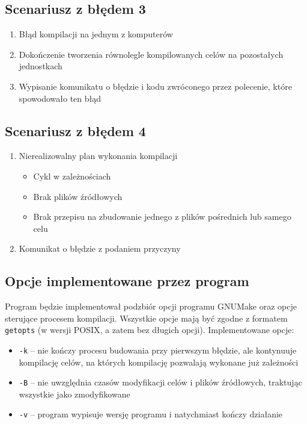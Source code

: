 \documentclass[a4paper]{article}
\begin{document}
\subsection{Scenariusz z błędem 3}

\begin{enumerate}
	\item Błąd kompilacji na jednym z komputerów
	\item Dokończenie tworzenia równolegle kompilowanych celów na pozostałych jednostkach
	\item Wypisanie komunikatu o błędzie i kodu zwróconego przez polecenie, które spowodowało ten błąd
\end{enumerate}


\subsection{Scenariusz z błędem 4}

\begin{enumerate}
	\item Nierealizowalny plan wykonania kompilacji
		\begin{itemize}
			\item Cykl w zależnościach
			\item Brak plików źródłowych
			\item Brak przepisu na zbudowanie jednego z plików pośrednich lub samego celu
		\end{itemize}
	\item Komunikat o błędzie z podaniem przyczyny
\end{enumerate}

\subsection{Opcje implementowane przez program}

Program będzie implementował podzbiór opcji programu GNUMake oraz opcje sterujące procesem kompilacji. Wszystkie opcje mają być zgodne z formatem \verb+getopts+ (w wersji POSIX, a zatem bez długich opcji).
Implementowane opcje:

\begin{itemize}
	\item \verb+-k+ -- nie kończy procesu budowania przy pierwszym błędzie, ale kontynuuje kompilację celów, na których kompilację pozwalają wykonane już zależności
	\item \verb+-B+ -- nie uwzględnia czasów modyfikacji celów i plików źródłowych, traktując wszystkie jako zmodyfikowane
	\item \verb+-v+ -- program wypisuje wersję programu i natychmiast kończy działanie
\end{itemize}
\end{document}
